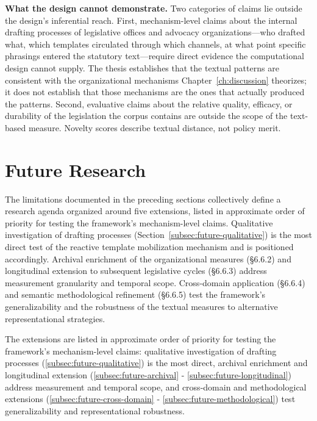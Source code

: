 \textbf{What the design cannot demonstrate.} Two categories of claims lie outside the design's inferential reach. First, mechanism-level claims about the internal drafting processes of legislative offices and advocacy organizations---who drafted what, which templates circulated through which channels, at what point specific phrasings entered the statutory text---require direct evidence the computational design cannot supply. The thesis establishes that the textual patterns are consistent with the organizational mechanisms Chapter~\ref{ch:discussion} theorizes; it does not establish that those mechanisms are the ones that actually produced the patterns. Second, evaluative claims about the relative quality, efficacy, or durability of the legislation the corpus contains are outside the scope of the text-based measure. Novelty scores describe textual distance, not policy merit.

\section{Future Research}
\label{sec:future-research}

The limitations documented in the preceding sections collectively define a research agenda organized around five extensions, listed in approximate order of priority for testing the framework's mechanism-level claims. Qualitative investigation of drafting processes (Section~\ref{subsec:future-qualitative}) is the most direct test of the reactive template mobilization mechanism and is positioned accordingly. Archival enrichment of the organizational measures (§6.6.2) and longitudinal extension to subsequent legislative cycles (§6.6.3) address measurement granularity and temporal scope. Cross-domain application (§6.6.4) and semantic methodological refinement (§6.6.5) test the framework's generalizability and the robustness of the textual measures to alternative representational strategies.

The extensions are listed in approximate order of priority for testing the framework's mechanism-level claims: qualitative investigation of drafting processes (\ref{subsec:future-qualitative}) is the most direct, archival enrichment and longitudinal extension (\ref{subsec:future-archival} - \ref{subsec:future-longitudinal}) address measurement and temporal scope, and cross-domain and methodological extensions (\ref{subsec:future-cross-domain} - \ref{subsec:future-methodological}) test generalizability and representational robustness.

